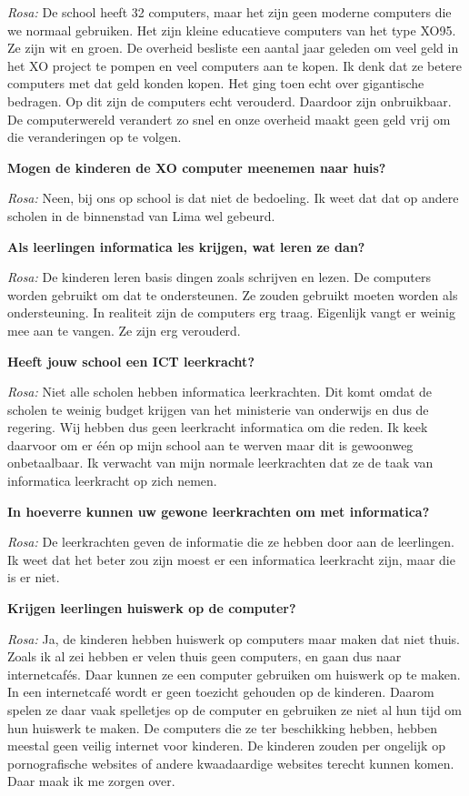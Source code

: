\textit{Rosa:} De school heeft 32 computers, maar het zijn geen moderne computers die we normaal gebruiken. Het zijn kleine educatieve computers van het type XO95. Ze zijn wit en groen. De overheid besliste een aantal jaar geleden om veel geld in het XO project te pompen en veel computers aan te kopen. Ik denk dat ze betere computers met dat geld konden kopen. Het ging toen echt over gigantische bedragen. Op dit zijn de computers echt verouderd. Daardoor zijn onbruikbaar. De computerwereld verandert zo snel en onze overheid maakt geen geld vrij om die veranderingen op te volgen.

\textbf{Mogen de kinderen de XO computer meenemen naar huis?}

\textit{Rosa:} Neen, bij ons op school is dat niet de bedoeling. Ik weet dat dat op andere scholen in de binnenstad van Lima wel gebeurd.

\textbf{Als leerlingen informatica les krijgen, wat leren ze dan?}

\textit{Rosa:} De kinderen leren basis dingen zoals schrijven en lezen. De computers worden gebruikt om dat te ondersteunen. Ze zouden gebruikt moeten worden als ondersteuning. In realiteit zijn de computers erg traag. Eigenlijk vangt er weinig mee aan te vangen. Ze zijn erg verouderd.

\textbf{Heeft jouw school een ICT leerkracht?}

\textit{Rosa:} Niet alle scholen hebben informatica leerkrachten. Dit komt omdat de scholen te weinig budget krijgen van het ministerie van onderwijs en dus de regering. Wij hebben dus geen leerkracht informatica om die reden. Ik keek daarvoor om er één op mijn school aan te werven maar dit is gewoonweg onbetaalbaar. Ik verwacht van mijn normale leerkrachten dat ze de taak van informatica leerkracht op zich nemen.  

\textbf{In hoeverre kunnen uw gewone leerkrachten om met informatica?}

\textit{Rosa:} De leerkrachten geven de informatie die ze hebben door aan de leerlingen. Ik weet dat het beter zou zijn moest er een informatica leerkracht zijn, maar die is er niet.

\textbf{Krijgen leerlingen huiswerk op de computer?}

\textit{Rosa:} Ja, de kinderen hebben huiswerk op computers maar maken dat niet thuis. Zoals ik al zei hebben er velen thuis geen computers, en gaan dus naar internetcafés. Daar kunnen ze een computer gebruiken om huiswerk op te maken. In een internetcafé wordt er  geen toezicht gehouden op de kinderen. Daarom spelen ze daar vaak spelletjes op de computer en gebruiken ze niet al hun tijd om hun huiswerk te maken. De computers die ze ter beschikking hebben, hebben meestal geen veilig internet voor kinderen. De kinderen zouden per ongelijk op pornografische websites of andere kwaadaardige websites terecht kunnen komen. Daar maak ik me zorgen over.

